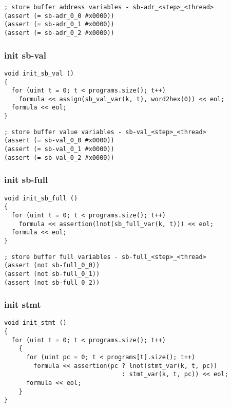 \begin{lstlisting}[language=SMTLib]
; store buffer address variables - sb-adr_<step>_<thread>
(assert (= sb-adr_0_0 #x0000))
(assert (= sb-adr_0_1 #x0000))
(assert (= sb-adr_0_2 #x0000))
\end{lstlisting}

\subsubsection{init sb-val}

\begin{lstlisting}[style=c++]
void init_sb_val ()
{
  for (uint t = 0; t < programs.size(); t++)
    formula << assign(sb_val_var(k, t), word2hex(0)) << eol;
  formula << eol;
}
\end{lstlisting}

\begin{lstlisting}[language=SMTLib]
; store buffer value variables - sb-val_<step>_<thread>
(assert (= sb-val_0_0 #x0000))
(assert (= sb-val_0_1 #x0000))
(assert (= sb-val_0_2 #x0000))
\end{lstlisting}

\subsubsection{init sb-full}

\begin{lstlisting}[style=c++]
void init_sb_full ()
{
  for (uint t = 0; t < programs.size(); t++)
    formula << assertion(lnot(sb_full_var(k, t))) << eol;
  formula << eol;
}
\end{lstlisting}

\begin{lstlisting}[language=SMTLib]
; store buffer full variables - sb-full_<step>_<thread>
(assert (not sb-full_0_0))
(assert (not sb-full_0_1))
(assert (not sb-full_0_2))
\end{lstlisting}

\subsubsection{init stmt}

\begin{lstlisting}[style=c++]
void init_stmt ()
{
  for (uint t = 0; t < programs.size(); t++)
    {
      for (uint pc = 0; t < programs[t].size(); t++)
        formula << assertion(pc ? lnot(stmt_var(k, t, pc))
                                : stmt_var(k, t, pc)) << eol;
      formula << eol;
    }
}
\end{lstlisting}

